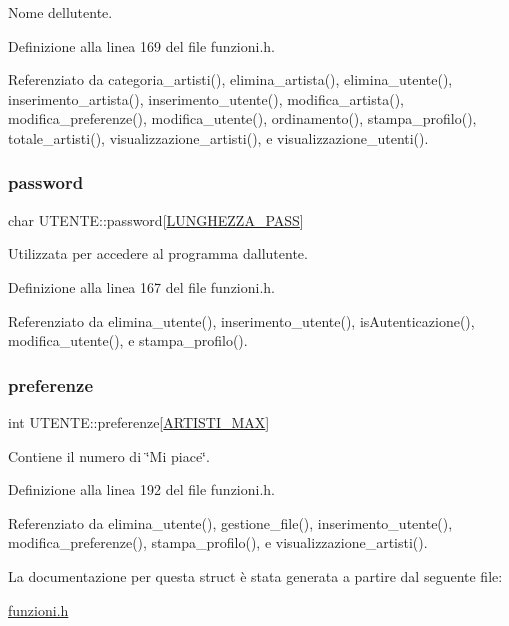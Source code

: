 Nome dell\textquotesingle{}utente. 

Definizione alla linea 169 del file funzioni.\+h.



Referenziato da categoria\+\_\+artisti(), elimina\+\_\+artista(), elimina\+\_\+utente(), inserimento\+\_\+artista(), inserimento\+\_\+utente(), modifica\+\_\+artista(), modifica\+\_\+preferenze(), modifica\+\_\+utente(), ordinamento(), stampa\+\_\+profilo(), totale\+\_\+artisti(), visualizzazione\+\_\+artisti(), e visualizzazione\+\_\+utenti().

\mbox{\label{struct_u_t_e_n_t_e_a04d8337f5e0fe9cd44d36cbe7dac7415}} 
\subsubsection{\texorpdfstring{password}{password}}
{\footnotesize\ttfamily char U\+T\+E\+N\+T\+E\+::password\mbox{[}\hyperlink{funzioni_8h_a21981b6e8c0f57093d564c3df476f9ee}{L\+U\+N\+G\+H\+E\+Z\+Z\+A\+\_\+\+P\+A\+SS}\mbox{]}}

Utilizzata per accedere al programma dall\textquotesingle{}utente. 

Definizione alla linea 167 del file funzioni.\+h.



Referenziato da elimina\+\_\+utente(), inserimento\+\_\+utente(), is\+Autenticazione(), modifica\+\_\+utente(), e stampa\+\_\+profilo().

\mbox{\label{struct_u_t_e_n_t_e_a1b4dec4c7ed79c12a76501b634b71176}} 
\subsubsection{\texorpdfstring{preferenze}{preferenze}}
{\footnotesize\ttfamily int U\+T\+E\+N\+T\+E\+::preferenze\mbox{[}\hyperlink{funzioni_8h_af17e5297d3cc4c2db33d467698a1b9c2}{A\+R\+T\+I\+S\+T\+I\+\_\+\+M\+AX}\mbox{]}}

Contiene il numero di \char`\"{}\+Mi piace\char`\"{}. 

Definizione alla linea 192 del file funzioni.\+h.



Referenziato da elimina\+\_\+utente(), gestione\+\_\+file(), inserimento\+\_\+utente(), modifica\+\_\+preferenze(), stampa\+\_\+profilo(), e visualizzazione\+\_\+artisti().



La documentazione per questa struct è stata generata a partire dal seguente file\+:\begin{DoxyCompactItemize}
\item 
\hyperlink{funzioni_8h}{funzioni.\+h}\end{DoxyCompactItemize}
